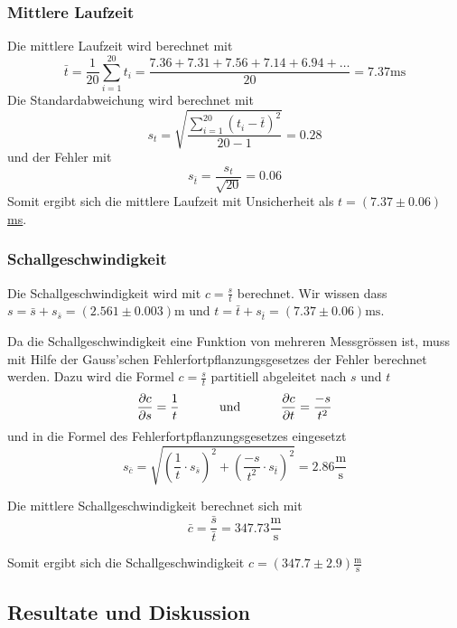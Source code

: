 \subsubsection*{Mittlere Laufzeit}

Die mittlere Laufzeit wird berechnet mit
\[ \bar{t} = \frac{1}{20} \sum_{i=1}^{20} t_i = \frac{7.36+7.31+7.56+7.14+6.94+\ldots}{20} = 7.37 \textrm{ms} \]
Die Standardabweichung wird berechnet mit
\[ s_t = \sqrt{ \frac{ \sum_{i=1}^{20} (t_i - \bar{t})^2 }{20-1} } = 0.28\]
und der Fehler mit
\[ s_{\bar{t}} = \frac{s_t}{\sqrt{20}} = 0.06 \]
Somit ergibt sich die mittlere Laufzeit mit Unsicherheit als \underline{\underline{$t = (7.37 \pm 0.06)$ ms}}.


\subsubsection*{Schallgeschwindigkeit}

Die Schallgeschwindigkeit wird mit $c=\frac{s}{t}$ berechnet. Wir wissen dass
$s=\bar{s}+s_{\bar{s}}=(2.561\pm0.003) \textrm{m}$
und
$t=\bar{t}+s_{\bar{t}}=(7.37\pm0.06) \textrm{ms}$.

Da die Schallgeschwindigkeit eine Funktion von mehreren Messgr\"ossen ist, muss mit Hilfe der
Gauss'schen Fehlerfortpflanzungsgesetzes der Fehler berechnet werden. Dazu wird die Formel $c=\frac{s}{t}$
partitiell abgeleitet nach $s$ und $t$
\[ \frac{\partial c}{\partial s} = \frac{1}{t} \textrm{\hspace{10mm} und \hspace{10mm}} \frac{\partial c}{\partial{t}} = \frac{-s}{t^2} \]
und in die Formel des Fehlerfortpflanzungsgesetzes eingesetzt
\[ s_{\bar{c}} = \sqrt{(\frac{1}{t} \cdot s_{\bar{s}})^2 + (\frac{-s}{t^2} \cdot s_{\bar{t}})^2} = 2.86 \frac{\textrm{m}}{\textrm{s}} \]

Die mittlere Schallgeschwindigkeit berechnet sich mit
\[ \bar{c}=\frac{\bar{s}}{\bar{t}} = 347.73 \frac{\textrm{m}}{\textrm{s}} \]

Somit ergibt sich die Schallgeschwindigkeit
\underline{\underline{$c=(347.7 \pm 2.9) \frac{\textrm{m}}{\textrm{s}}$}}


\subsection{Resultate und Diskussion}


